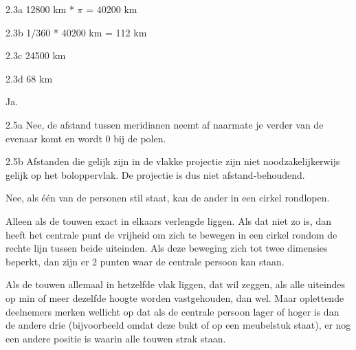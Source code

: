 \begin{Antwoord}{2.3a}
			12800 km * $\pi$ = 40200 km
		
\end{Antwoord}
\begin{Antwoord}{2.3b}
			1/360 * 40200 km = 112 km
		
\end{Antwoord}
\begin{Antwoord}{2.3c}
			24500 km
		
\end{Antwoord}
\begin{Antwoord}{2.3d}
			68 km
		
\end{Antwoord}
\begin{Antwoord}{2.4}
		Ja.
	
\end{Antwoord}
\begin{Antwoord}{2.5a}
			Nee, de afstand tussen meridianen neemt af naarmate je verder van de evenaar komt en wordt 0 bij de polen.
		
\end{Antwoord}
\begin{Antwoord}{2.5b}
			Afstanden die gelijk zijn in de vlakke projectie zijn niet noodzakelijkerwijs gelijk op het boloppervlak. De projectie is dus niet afstand-behoudend.
		
\end{Antwoord}
\begin{Antwoord}{4.1}
		Nee, als \'e\'en van de personen stil staat, kan de ander in een cirkel rondlopen.
	
\end{Antwoord}
\begin{Antwoord}{4.2}
		Alleen als de touwen exact in elkaars verlengde liggen. Als dat niet zo is, dan heeft het centrale punt de vrijheid om zich te bewegen in een cirkel rondom de rechte lijn tussen beide uiteinden. Als deze beweging zich tot twee dimensies beperkt, dan zijn er 2 punten waar de centrale persoon kan staan.
	
\end{Antwoord}
\begin{Antwoord}{4.3}
		Als de touwen allemaal in hetzelfde vlak liggen, dat wil zeggen, als alle uiteindes op min of meer dezelfde hoogte worden 	vastgehouden, dan wel. Maar oplettende deelnemers merken wellicht op dat als de centrale persoon lager of hoger is dan de 			andere drie (bijvoorbeeld omdat deze bukt of op een meubelstuk staat), er nog een andere positie is waarin alle touwen 				strak staan.
	
\end{Antwoord}
